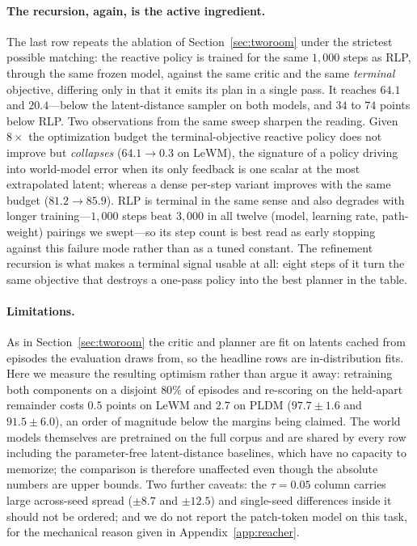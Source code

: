 \paragraph{The recursion, again, is the active ingredient.}
The last row repeats the ablation of Section~\ref{sec:tworoom} under the
strictest possible matching: the reactive policy is trained for the same
$1{,}000$ steps as RLP, through the same frozen model, against the same critic
and the same \emph{terminal} objective, differing only in that it emits its plan
in a single pass. It reaches $64.1$ and $20.4$---below the latent-distance
sampler on both models, and $34$ to $74$ points below RLP. Two observations from
the same sweep sharpen the reading. Given $8\times$ the optimization budget the
terminal-objective reactive policy does not improve but \emph{collapses}
($64.1 \to 0.3$ on LeWM), the signature of a policy driving into world-model
error when its only feedback is one scalar at the most extrapolated latent;
whereas a dense per-step variant improves with the same budget
($81.2 \to 85.9$). RLP is terminal in the same sense and also degrades with
longer training---$1{,}000$ steps beat $3{,}000$ in all twelve
(model, learning rate, path-weight) pairings we swept---so its step count is
best read as early stopping against this failure mode rather than as a tuned
constant. The refinement recursion is what makes a terminal signal usable at
all: eight steps of it turn the same objective that destroys a one-pass policy
into the best planner in the table.

\paragraph{Limitations.}
As in Section~\ref{sec:tworoom} the critic and planner are fit on latents cached
from episodes the evaluation draws from, so the headline rows are
in-distribution fits. Here we measure the resulting optimism rather than argue
it away: retraining both components on a disjoint $80\%$ of episodes and
re-scoring on the held-apart remainder costs $0.5$ points on LeWM and $2.7$ on
PLDM ($97.7 \pm 1.6$ and $91.5 \pm 6.0$), an order of magnitude below the
margins being claimed. The world models themselves are pretrained on the full
corpus and are shared by every row including the parameter-free latent-distance
baselines, which have no capacity to memorize; the comparison is therefore
unaffected even though the absolute numbers are upper bounds. Two further
caveats: the $\tau = 0.05$ column carries large across-seed spread
($\pm 8.7$ and $\pm 12.5$) and single-seed differences inside it should not be
ordered; and we do not report the patch-token model on this task, for the
mechanical reason given in Appendix~\ref{app:reacher}.


